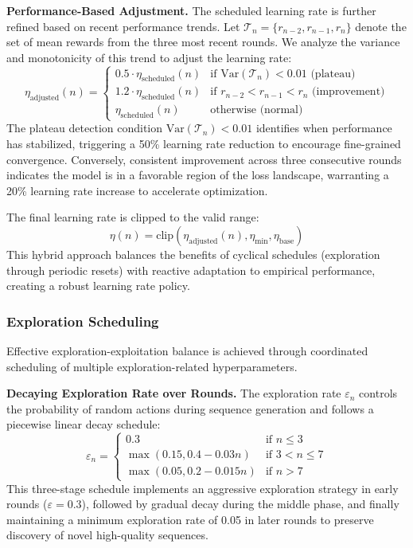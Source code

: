 \documentclass[conference]{IEEEtran}
\begin{document}
\textbf{Performance-Based Adjustment.} The scheduled learning rate is further refined based on recent performance trends. Let $\mathcal{T}_n = \{r_{n-2}, r_{n-1}, r_n\}$ denote the set of mean rewards from the three most recent rounds. We analyze the variance and monotonicity of this trend to adjust the learning rate:
%
\begin{equation}
\eta_{\text{adjusted}}(n) = \begin{cases}
0.5 \cdot \eta_{\text{scheduled}}(n) & \text{if } \text{Var}(\mathcal{T}_n) < 0.01 \text{ (plateau)} \\
1.2 \cdot \eta_{\text{scheduled}}(n) & \text{if } r_{n-2} < r_{n-1} < r_n \text{ (improvement)} \\
\eta_{\text{scheduled}}(n) & \text{otherwise (normal)}
\end{cases}
\end{equation}
%
The plateau detection condition $\text{Var}(\mathcal{T}_n) < 0.01$ identifies when performance has stabilized, triggering a 50\% learning rate reduction to encourage fine-grained convergence. Conversely, consistent improvement across three consecutive rounds indicates the model is in a favorable region of the loss landscape, warranting a 20\% learning rate increase to accelerate optimization.

The final learning rate is clipped to the valid range:
%
\begin{equation}
\eta(n) = \text{clip}(\eta_{\text{adjusted}}(n), \eta_{\text{min}}, \eta_{\text{base}})
\end{equation}
%
This hybrid approach balances the benefits of cyclical schedules (exploration through periodic resets) with reactive adaptation to empirical performance, creating a robust learning rate policy.

\subsubsection{Exploration Scheduling}

Effective exploration-exploitation balance is achieved through coordinated scheduling of multiple exploration-related hyperparameters.

\textbf{Decaying Exploration Rate over Rounds.} The exploration rate $\varepsilon_n$ controls the probability of random actions during sequence generation and follows a piecewise linear decay schedule:
%
\begin{equation}
\varepsilon_n = \begin{cases}
0.3 & \text{if } n \leq 3 \\
\max(0.15, 0.4 - 0.03n) & \text{if } 3 < n \leq 7 \\
\max(0.05, 0.2 - 0.015n) & \text{if } n > 7
\end{cases}
\end{equation}
%
This three-stage schedule implements an aggressive exploration strategy in early rounds ($\varepsilon = 0.3$), followed by gradual decay during the middle phase, and finally maintaining a minimum exploration rate of 0.05 in later rounds to preserve discovery of novel high-quality sequences.
\end{document}
